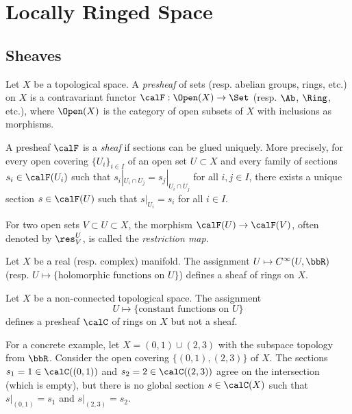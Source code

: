 \section{Locally Ringed Space}

\subsection{Sheaves}

    \begin{definition}\label{def:sheaves}
        Let \(X\) be a topological space.
        A \emph{presheaf} of sets (resp. abelian groups, rings, etc.) on \(X\) is a contravariant functor \(\calF : \Open(X) \to \Set\) (resp. \(\Ab\), \(\Ring\), etc.), 
        where \(\Open(X)\) is the category of open subsets of \(X\) with inclusions as morphisms.

        A presheaf \(\calF\) is a \emph{sheaf} if sections can be glued uniquely.
        More precisely, for every open covering \(\{U_i\}_{i \in I}\) of an open set \(U \subset X\) and every family of sections \(s_i \in \calF(U_i)\) such that \(s_i|_{U_i \cap U_j} = s_j|_{U_i \cap U_j}\) for all \(i,j \in I\),
        there exists a unique section \(s \in \calF(U)\) such that \(s|_{U_i} = s_i\) for all \(i \in I\).
    \end{definition}

    For two open sets \(V \subset U \subset X\), the morphism \(\calF(U) \to \calF(V)\), often denoted by \(\res^U_V\), is called the \emph{restriction map}.

    \begin{example}\label{eg:sheaf_of_smooth_and_analytic_functions}
        Let \(X\) be a real (resp. complex) manifold.
        The assignment \(U \mapsto C^\infty(U, \bbR)\) (resp. \(U \mapsto \{\text{holomorphic functions on }U\}\)) defines a sheaf of rings on \(X\).
    \end{example}

    \begin{example}\label{eg:presheaf_but_not_sheaf}
        Let \(X\) be a non-connected topological space.
        The assignment 
        \[U \mapsto \{\text{constant functions on }U\}\] 
        defines a presheaf \(\calC\) of rings on \(X\) but not a sheaf.

        For a concrete example, let \(X = (0,1)\cup (2,3)\) with the subspace topology from \(\bbR\).
        Consider the open covering \(\{(0,1), (2,3)\}\) of \(X\).
        The sections \(s_1 = 1 \in \calC((0,1))\) and \(s_2 = 2 \in \calC((2,3))\) agree on the intersection (which is empty), 
        but there is no global section \(s \in \calC(X)\) such that \(s|_{(0,1)} = s_1\) and \(s|_{(2,3)} = s_2\).
    \end{example}


